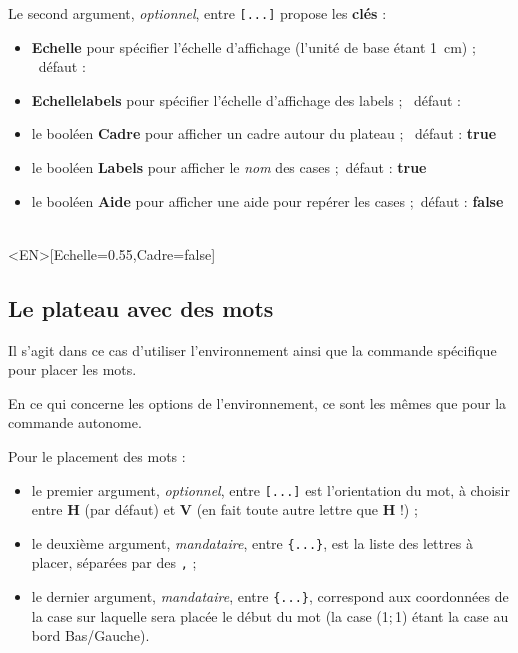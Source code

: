 \documentclass{article}
\newcommand\Cle[1]{{\bfseries\sffamily\textlangle #1\textrangle}}
\begin{document}
\smallskip

Le second argument, \textit{optionnel}, entre \texttt{[...]} propose les \Cle{clés} :

\begin{itemize}
	\item \Cle{Echelle} pour spécifier l'échelle d'affichage (l'unité de base étant 1~cm) ; \hfill~défaut : \Cle{1}
	\item \Cle{Echellelabels} pour spécifier l'échelle d'affichage des labels ; \hfill~défaut : \Cle{1}
	\item le booléen \Cle{Cadre} pour afficher un cadre autour du plateau ; \hfill~défaut : \Cle{true}
	\item le booléen \Cle{Labels} pour afficher le \textit{nom} des cases ;\hfill~défaut : \Cle{true}
	\item le booléen \Cle{Aide} pour afficher une aide pour repérer les cases ;\hfill~défaut : \Cle{false}
\end{itemize}

\begin{PresentationCode}{}
\PlateauScrabble[Labels=false,Echelle=0.55]\\     %
\PlateauScrabble<EN>[Echelle=0.55,Cadre=false]    %
\end{PresentationCode}

\newpage

\subsection{Le plateau avec des mots}

Il s'agit dans ce cas d'utiliser l'\textsf{environnement} ainsi que la \textsf{commande} spécifique pour placer les mots.

\smallskip

En ce qui concerne les options de l'\textsf{environnement}, ce sont les mêmes que pour la \textsf{commande} autonome.

\smallskip

Pour le placement des mots :

\begin{itemize}
	\item le premier argument, \textit{optionnel}, entre \texttt{[...]} est l'orientation du mot, à choisir entre \Cle{H} (par défaut) et \Cle{V} (en fait toute autre lettre que \Cle{H} !) ;
	\item le deuxième argument, \textit{mandataire}, entre \texttt{\{...\}}, est la liste des lettres à placer, séparées par des \og \texttt{,} \fg{} ;
	\item le dernier argument, \textit{mandataire}, entre \texttt{\{...\}}, correspond aux coordonnées de la case sur laquelle sera placée le début du mot (la case (1;\,1) étant la case au bord Bas/Gauche).
\end{itemize}
\end{document}
